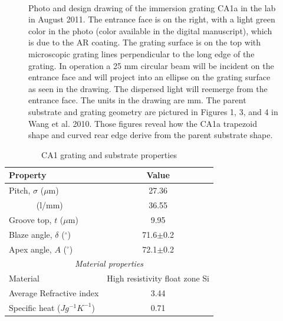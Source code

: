 \begin{figure}
  \centering
	~
  \caption[Photo and design drawing of the IGRINS immersion grating]{Photo and design drawing of the immersion grating CA1a in the lab in August 2011.  The entrance face is on the right, with a light green color in the photo (color available in the digital manuscript), which is due to the AR coating.  The grating surface is on the top with microscopic grating lines perpendicular to the long edge of the grating.  In operation a 25 mm circular beam will be incident on the entrance face and will project into an ellipse on the grating surface as seen in the drawing.  The dispersed light will reemerge from the entrance face.  The units in the drawing are mm.  The parent substrate and grating geometry are pictured in Figures 1, 3, and 4 in Wang et al. 2010\cite{2010SPIE.7739E.146W}.  Those figures reveal how the CA1a trapezoid shape and curved rear edge derive from the parent substrate shape.}
  \label{fig:gram}
\end{figure}

\begin{table}[h]
\caption {CA1 grating and substrate properties} \label{tab:title} 
\begin{center}
\begin{tabular}{lc}
\hline
Property & Value \\
\hline
Pitch, $\sigma$ ($\mu$m)  & 27.36 \\
$\;\;\;\;\;\;\;\;\;\;\;\;$(l/mm) & 36.55\\
Groove top, $t$ ($\mu$m)  & 9.95 \\
Blaze angle, $\delta$ ($^\circ$)  & 71.6$\pm$0.2 \\
Apex angle, $A$ ($^\circ$) & 72.1$\pm$0.2 \\
\multicolumn{2}{c}{\emph{Material properties}} \\
Material & High resistivity float zone Si \\
Average Refractive index & 3.44 \\
Specific heat ($J g^{-1} K^{-1}$) & 0.71 \\ 
\hline
\end{tabular}
\end{center}
\end{table}


